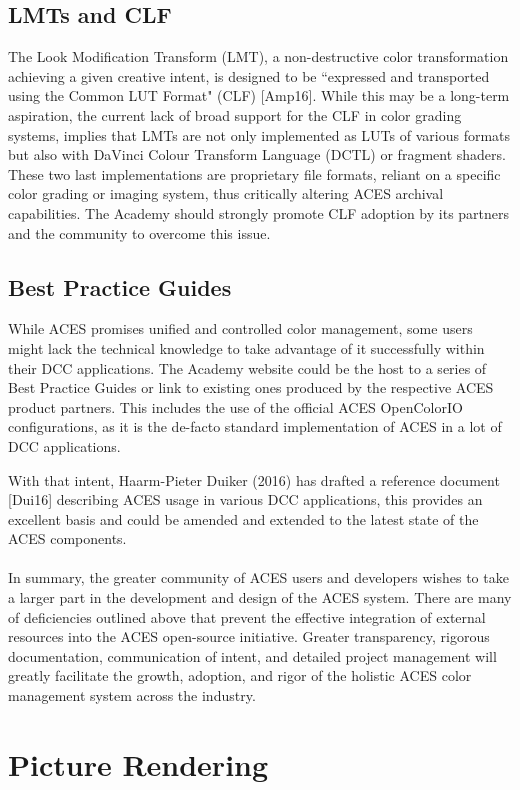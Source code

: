 \documentclass[conference]{IEEEtran}
\begin{document}
\subsection{LMTs and CLF}
The Look Modification Transform (LMT), a non-destructive color transformation achieving a given creative intent, is designed to be ``expressed and transported using the Common LUT Format" (CLF) [Amp16]. While this may be a long-term aspiration, the current lack of broad support for the CLF in color grading systems, implies that LMTs are not only implemented as LUTs of various formats but also with DaVinci Colour Transform Language (DCTL) or fragment shaders. These two last implementations are proprietary file formats, reliant on a specific color grading or imaging system, thus critically altering ACES archival capabilities. The Academy should strongly promote CLF adoption by its partners and the community to overcome this issue.

\subsection{Best Practice Guides}
While ACES promises unified and controlled color management, some users might lack the technical knowledge to take advantage of it successfully within their DCC applications. The Academy website could be the host to a series of Best Practice Guides or link to existing ones produced by the respective ACES product partners. This includes the use of the official ACES OpenColorIO configurations, as it is the de-facto standard implementation of ACES in a lot of DCC applications.

With that intent, Haarm-Pieter Duiker (2016) has drafted a reference document [Dui16] describing ACES usage in various DCC applications, this provides an excellent basis and could be amended and extended to the latest state of the ACES components.
\\ \\
In summary, the greater community of ACES users and developers wishes to take a larger part in the development and design of the ACES system. There are many of deficiencies outlined above that prevent the effective integration of external resources into the ACES open-source initiative. Greater transparency, rigorous documentation, communication of intent, and detailed project management will greatly facilitate the growth, adoption, and rigor of the holistic ACES color management system across the industry.

\section{Picture Rendering}
\end{document}
